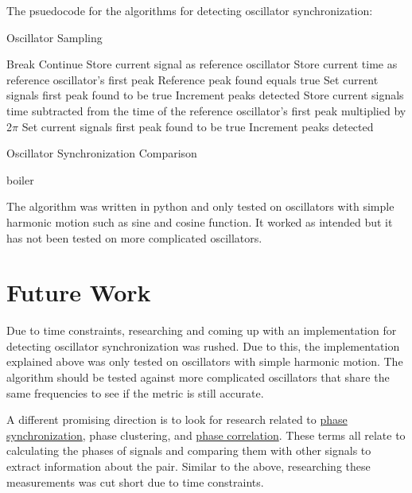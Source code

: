 \documentclass{article}
\begin{document}
The psuedocode for the algorithms for detecting oscillator synchronization:
\begin{algorithm}
	\caption{Oscillator Sampling}
	\begin{algorithmic}[1]
		\State Break
		\EndIf
		\State Continue
		\EndIf
		\State Store current signal as reference oscillator
		\State Store current time as reference oscillator's first peak
		\State Reference peak found equals true
		\State Set current signals first peak found to be true
		\State Increment peaks detected
		\Else
		\State Store current signals time subtracted from the time of the reference oscillator's first peak \State 		multiplied by 2$\pi$
		\State Set current signals first peak found to be true
		\State Increment peaks detected
		\EndIf
		\EndIf
		\EndFor
		\EndFor
	\end{algorithmic} 
\end{algorithm} 

\begin{algorithm}
	\caption{Oscillator Synchronization Comparison}
	\begin{algorithmic}[2]
		\State boiler
	\end{algorithmic} 
\end{algorithm} 

The algorithm was written in python and only tested on oscillators with simple harmonic motion such as sine and cosine function. It worked as intended but it has not been tested on more complicated oscillators.

								
\section{Future Work}
Due to time constraints, researching and coming up with an implementation for detecting oscillator synchronization was rushed. Due to this, the implementation explained above was only tested on oscillators with simple harmonic motion. The algorithm should be tested against more complicated oscillators that share the same frequencies to see if the metric is still accurate.

A different promising direction is to look for research related to \href{https://en.wikipedia.org/wiki/Phase_synchronization}{phase synchronization}, phase clustering, and \href{https://en.wikipedia.org/wiki/Phase_correlation}{phase correlation}. These terms all relate to calculating the phases of signals and comparing them with other signals to extract information about the pair. Similar to the above, researching these measurements was cut short due to time constraints.



\end{document}
